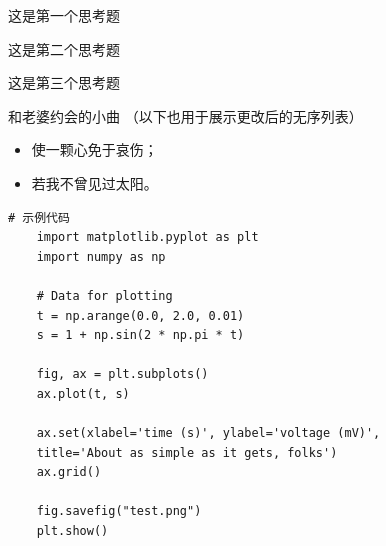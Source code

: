 \begin{question}
	这是第一个思考题
\end{question}

\begin{question}
	这是第二个思考题
\end{question}

\begin{question}
	这是第三个思考题
\end{question}


\begin{ubox}{和老婆约会的小曲}
	（以下也用于展示更改后的无序列表）
	\begin{itemize}
		\item 使一颗心免于哀伤；
		\item 若我不曾见过太阳。
	\end{itemize}
\end{ubox}

\begin{lstlisting}[style=pythonstyle,caption=代码记录示例]
	# 示例代码
	import matplotlib.pyplot as plt
	import numpy as np
	
	# Data for plotting
	t = np.arange(0.0, 2.0, 0.01)
	s = 1 + np.sin(2 * np.pi * t)
	
	fig, ax = plt.subplots()
	ax.plot(t, s)
	
	ax.set(xlabel='time (s)', ylabel='voltage (mV)',
	title='About as simple as it gets, folks')
	ax.grid()
	
	fig.savefig("test.png")
	plt.show()
\end{lstlisting}

